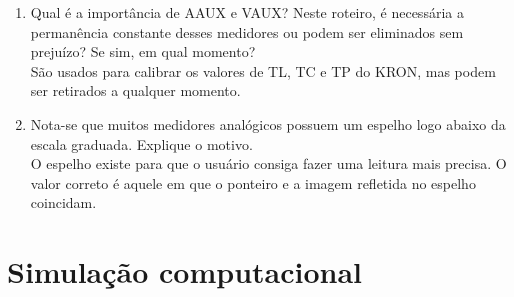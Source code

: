 \documentclass[a4paper,12pt,oneside,openany,table,xcdraw]{article}
\begin{document}
\begin{enumerate}[1)]
\item Qual é a importância de AAUX e VAUX? Neste roteiro, é necessária a permanência constante desses medidores
ou podem ser eliminados sem prejuízo? Se sim, em qual momento?\\
São usados para calibrar os valores de TL, TC e TP do KRON, mas podem ser
retirados a qualquer momento.

\item Nota-se que muitos medidores analógicos possuem um espelho logo abaixo da escala graduada. Explique o
motivo.\\
O espelho existe para que o usuário consiga fazer uma leitura mais precisa. O
valor correto é aquele em que o ponteiro e a imagem refletida no espelho coincidam.
\end{enumerate}


\section{Simulação computacional} %
\end{document}
